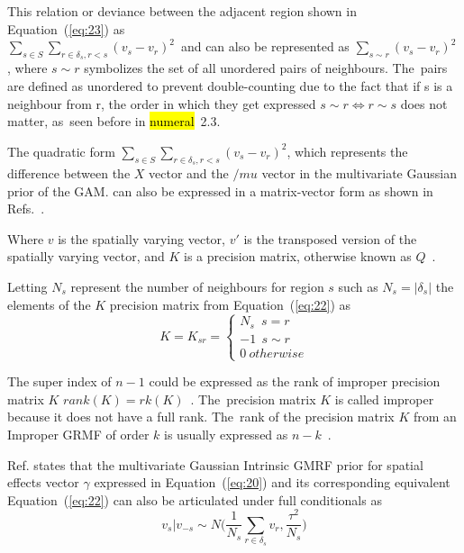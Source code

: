 \documentclass[energies,article,accept,pdftex,moreauthors]{Definitions/mdpi}
\begin{document}
    This relation or deviance between the adjacent region shown in Equation~(\ref{eq:23}) as \\ \(\sum_{s \in S} \sum_{r \in \delta_s, r<s}(v_s-v_r)^2\)~and \citep{Rue2005GaussianApplications,Wang2014SpatialComputations} can also be represented as \(\sum_{s \sim r}(v_s-v_r)^2\) , where $s \sim r$ symbolizes the set of all unordered pairs of neighbours. The~pairs are defined as unordered to prevent double-counting due to the fact that if s is a  neighbour from r,  the order in which they get  expressed \(s \sim r \Longleftrightarrow r \sim s\) does not matter, as~seen before in \hl{numeral}~2.3.%
    
    
    The quadratic form \(\sum_{s \in S} \sum_{r \in \delta_s, r<s}(v_s-v_r)^2\), which represents the difference between the $X$ vector and the $/mu$ vector in the multivariate Gaussian prior of the GAM. can also be expressed in a matrix-vector form as shown in Refs.~\citep{Fahrmeir2001BayesianPriors,Fahrmeir2004PENALIZEDPERSPECTIVE,Fahrmeir2011BayesianData}.
    
    Where $v$ is the spatially varying vector, $v'$ is the transposed version of the spatially varying vector, and $K$ is a precision matrix, otherwise known as $Q$~\citep{Rue2005GaussianApplications}.
    
    Letting $N_{s}$ represent the number of neighbours for region $s$ such as \(N_{s}= |\delta_s |\) the elements of the $K$ precision matrix from 
    Equation~(\ref{eq:22}) as
\begin{equation}
        K=K_{sr}=
        \begin{cases}
         N_s \; \: s=r \\
         -1 \:  \:s \sim r \\
         0 \: otherwise
        \end{cases}
    \end{equation}
    
    The super index of $n-1$ could be expressed as the rank of improper precision matrix $K$ \(rank(K)=rk(K)\)~\citep{Fahrmeir2009ProprietyEvidence}. The~precision matrix $K$ is called improper because it does not have a full rank. The~rank of the precision matrix $K$ from an Improper GRMF of order $k$ is usually expressed as \(n-k\)~\citep{Rue2005GaussianApplications}.
    
Ref. \citep{Fahrmeir2011BayesianData} states that the multivariate Gaussian Intrinsic GMRF prior for spatial effects vector $\gamma$ expressed in Equation~(\ref{eq:20})  and its corresponding equivalent Equation~(\ref{eq:22}) can also be articulated under full conditionals as
\begin{equation}\label{eq:25}
        v_s \vert v_{-s} \sim N \big( \frac{1}{N_s} \sum_{r \in \delta_s} v_r,  \frac{\tau^2}{N_s} \big)
    \end{equation}
    
\end{document}

